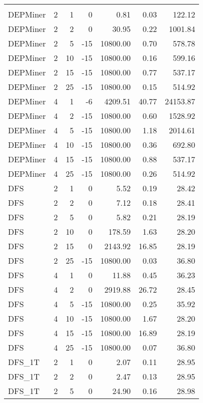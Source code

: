 \begin{center}
\begin{longtable}{lrrrrrr}
\hline\endlastfoot
\\
DEPMiner     & 2 & 1 &   0 & 0.81 & 0.03 & 122.12 \\ 
  DEPMiner     & 2 & 2 &   0 & 30.95 & 0.22 & 1001.84 \\ 
  DEPMiner     & 2 & 5 & -15 & 10800.00 & 0.70 & 578.78 \\ 
  DEPMiner     & 2 & 10 & -15 & 10800.00 & 0.16 & 599.16 \\ 
  DEPMiner     & 2 & 15 & -15 & 10800.00 & 0.77 & 537.17 \\ 
  DEPMiner     & 2 & 25 & -15 & 10800.00 & 0.15 & 514.92 \\ 
  DEPMiner     & 4 & 1 &  -6 & 4209.51 & 40.77 & 24153.87 \\ 
  DEPMiner     & 4 & 2 & -15 & 10800.00 & 0.60 & 1528.92 \\ 
  DEPMiner     & 4 & 5 & -15 & 10800.00 & 1.18 & 2014.61 \\ 
  DEPMiner     & 4 & 10 & -15 & 10800.00 & 0.36 & 692.80 \\ 
  DEPMiner     & 4 & 15 & -15 & 10800.00 & 0.88 & 537.17 \\ 
  DEPMiner     & 4 & 25 & -15 & 10800.00 & 0.26 & 514.92 \\ 
  DFS     & 2 & 1 &   0 & 5.52 & 0.19 & 28.42 \\ 
  DFS     & 2 & 2 &   0 & 7.12 & 0.18 & 28.41 \\ 
  DFS     & 2 & 5 &   0 & 5.82 & 0.21 & 28.19 \\ 
  DFS     & 2 & 10 &   0 & 178.59 & 1.63 & 28.20 \\ 
  DFS     & 2 & 15 &   0 & 2143.92 & 16.85 & 28.19 \\ 
  DFS     & 2 & 25 & -15 & 10800.00 & 0.03 & 36.80 \\ 
  DFS     & 4 & 1 &   0 & 11.88 & 0.45 & 36.23 \\ 
  DFS     & 4 & 2 &   0 & 2919.88 & 26.72 & 28.45 \\ 
  DFS     & 4 & 5 & -15 & 10800.00 & 0.25 & 35.92 \\ 
  DFS     & 4 & 10 & -15 & 10800.00 & 1.67 & 28.20 \\ 
  DFS     & 4 & 15 & -15 & 10800.00 & 16.89 & 28.19 \\ 
  DFS     & 4 & 25 & -15 & 10800.00 & 0.07 & 36.80 \\ 
  DFS\_1T     & 2 & 1 &   0 & 2.07 & 0.11 & 28.95 \\ 
  DFS\_1T     & 2 & 2 &   0 & 2.47 & 0.13 & 28.95 \\ 
  DFS\_1T     & 2 & 5 &   0 & 24.90 & 0.16 & 28.98 \\ 

\end{longtable}
\end{center}
